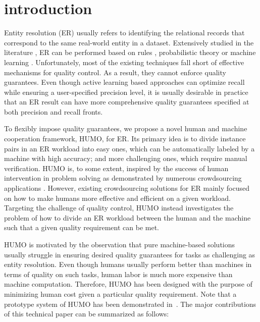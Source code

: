 \section{introduction}
  Entity resolution (ER) usually refers to identifying the relational records that correspond to the same real-world entity in a dataset. Extensively studied in the literature \cite{christen2012data}, ER can be performed based on rules \cite{fan2009reasoning, li2015rule, singh2017generating}, probabilistic theory \cite{fellegi1969theory} or machine learning \cite{sarawagi2002interactive, kouki2017collective, arasu2010active, bellare2012active}. Unfortunately, most of the existing techniques fall short of effective mechanisms for quality control. As a result, they cannot enforce quality guarantees. Even though active learning based approaches \cite{arasu2010active, bellare2012active} can optimize recall while ensuring a user-specified precision level, it is usually desirable in practice that an ER result can have more comprehensive quality guarantees specified at both precision and recall fronts.

  To flexibly impose quality guarantees, we propose a novel human and machine cooperation framework, HUMO, for ER. Its primary idea is to divide instance pairs in an ER workload into easy ones, which can be automatically labeled by a machine with high accuracy; and more challenging ones, which require manual verification. HUMO is, to some extent, inspired by the success of human intervention in problem solving as demonstrated by numerous crowdsourcing applications \cite{li2016crowdsourced}. However, existing crowdsourcing solutions for ER \cite{wang2012crowder, whang2013question, vesdapunt2014crowdsourcing, gokhale2014corleone, mozafari2014scaling, wang2015crowd, chai2016cost} mainly focused on how to make humans more effective and efficient on a given workload. Targeting the challenge of quality control, HUMO instead investigates the problem of how to divide an ER workload between the human and the machine such that a given quality requirement can be met.

  HUMO is motivated by the observation that pure machine-based solutions usually struggle in ensuring desired quality guarantees for tasks as challenging as entity resolution. Even though humans usually perform better than machines in terms of quality on such tasks, human labor is much more expensive than machine computation. Therefore, HUMO has been designed with the purpose of minimizing human cost given a particular quality requirement. Note that a prototype system of HUMO has been demonstrated in~\cite{chen2017humo}. The major contributions of this technical paper can be summarized as follows:

